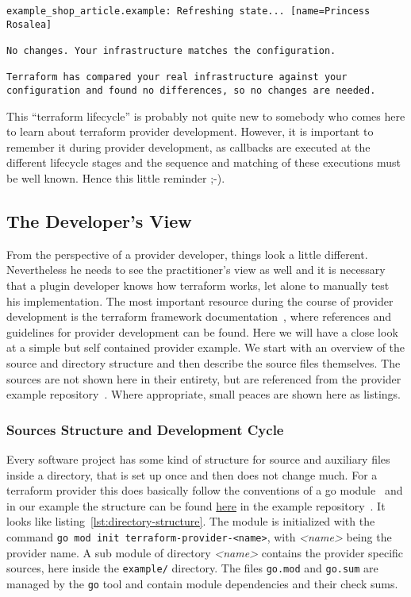 \documentclass[paper=a4,11pt,numbers=noenddot]{article}
\begin{document}
\begin{lstlisting}[label=lst:exampletfPlanInSync]
example_shop_article.example: Refreshing state... [name=Princess Rosalea]

No changes. Your infrastructure matches the configuration.

Terraform has compared your real infrastructure against your configuration and found no differences, so no changes are needed.
\end{lstlisting}

This ``terraform lifecycle'' is probably not quite new to somebody who comes here to learn about terraform provider development. However, it is important to remember it during provider development, as callbacks are executed at the different lifecycle stages and the sequence and matching of these executions must be well known. Hence this little reminder ;-).

\subsection{The Developer's View}
\label{subsec:developers-view}

From the perspective of a provider developer, things look a little different. Nevertheless he needs to see the practitioner's view as well and it is necessary that a plugin developer knows how terraform works, let alone to manually test his implementation. The most important resource during the course of provider development is the terraform framework documentation~\cite{noauthor_terraform_framework_nodate}, where references and guidelines for provider development can be found. Here we will have a close look at a simple but self contained provider example. We start with an overview of the source and directory structure and then describe the source files themselves. The sources are not shown here in their entirety, but are referenced from the provider example repository~\cite{ecky-l_terraform-provider-example_nodate}. Where appropriate, small peaces are shown here as listings.

\subsubsection{Sources Structure and Development Cycle}
\label{subsubsec:prov-sourc-struct}

Every software project has some kind of structure for source and auxiliary files inside a directory, that is set up once and then does not change much. For a terraform provider this does basically follow the conventions of a go module~\cite{noauthor_go_modules_nodate} and in our example the structure can be found \href{https://github.com/ecky-l/terraform-provider-example/tree/main/src/tfp-example}{here} in the example repository~\cite{ecky-l_terraform-provider-example_nodate}. It looks like listing~\ref{lst:directory-structure}. The module is initialized with the command \verb'go mod init terraform-provider-<name>', with \emph{<name>} being the provider name. A sub module of directory \emph{<name>} contains the provider specific sources, here inside the \verb'example/' directory. The files \verb'go.mod' and \verb'go.sum' are managed by the \verb'go' tool and contain module dependencies and their check sums.
\end{document}
